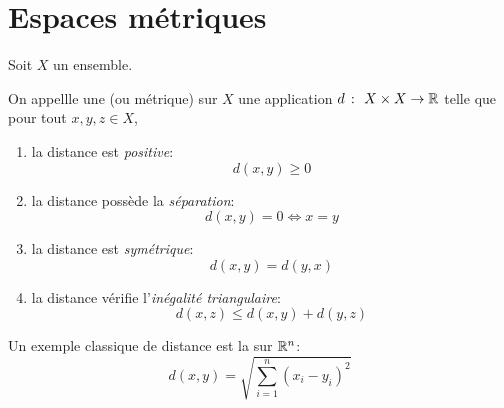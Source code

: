 \section{Espaces métriques}\label{sec:espaces-metriques}

Soit \(X\) un ensemble.

\begin{definition}
    On appellle une  (ou métrique) sur \(X\)
    une application \(d\ \colon\ X \times X \to \mathbb{R}\) telle que
    pour tout \(x, y, z \in X\),
    \begin{enumerate}[label=(\roman*)]
        \item la distance est \emph{positive}:
        \begin{equation*}
            d(x, y) \geq 0
        \end{equation*}

        \item la distance possède la \emph{séparation}:
        \begin{equation*}
            d(x, y) = 0 \iff x = y
        \end{equation*}

        \item la distance est \emph{symétrique}:
        \begin{equation*}
            d(x, y) = d(y, x)
        \end{equation*}

        \item la distance vérifie l'\emph{inégalité triangulaire}:
        \begin{equation*}
            d(x, z) \leq d(x, y) + d(y, z)
        \end{equation*}
    \end{enumerate}
\end{definition}

\begin{example}
    Un exemple classique de distance est la  sur \(\mathbb{R}^n\):
    \begin{equation*}
        d(x, y) = \sqrt{\sum_{i=1}^n {(x_i - y_i)}^2}
    \end{equation*}
\end{example}

